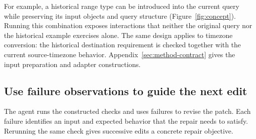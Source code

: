 For example, a historical range type can be introduced into the current
query while preserving its input objects and query structure
(Figure~\ref{fig:concept}). Running this combination exposes interactions
that neither the original query nor the historical example exercises alone.
The same design applies to timezone conversion: the historical destination
requirement is checked together with the current source-timezone behavior.
Appendix~\ref{sec:method-contract} gives the input preparation and adapter
constructions.

\subsection{Use failure observations to guide the next edit}\label{sec:feedback}
The agent runs the constructed checks and uses failures to revise the patch.
Each failure identifies an input and expected behavior that the repair needs
to satisfy. Rerunning the same check gives successive edits a concrete
repair objective.
